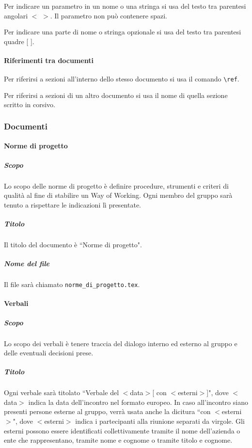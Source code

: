 \documentclass[a4paper, 12pt]{article}
\begin{document}
Per indicare un parametro in un nome o una stringa si usa del testo tra parentesi angolari $<$ $>$. Il parametro non può contenere spazi.

Per indicare una parte di nome o stringa opzionale si usa del testo tra parentesi quadre [ ].

\paragraph{Riferimenti tra documenti}
Per riferirsi a sezioni all'interno dello stesso documento si usa il comando \verb-\ref-.

Per riferirsi a sezioni di un altro documento si usa il nome di quella sezione scritto in corsivo.

\subsubsection{Documenti}\label{documentazione-documenti}

\paragraph{Norme di progetto}
\subparagraph{Scopo}
Lo scopo delle norme di progetto è definire procedure, strumenti e criteri di qualità al fine di stabilire un Way of Working. Ogni membro del gruppo sarà tenuto a rispettare le indicazioni lì presentate.
\subparagraph{Titolo}
Il titolo del documento è ``Norme di progetto".
\subparagraph{Nome del file}
Il file sarà chiamato \texttt{norme\_di\_progetto.tex}.

\paragraph{Verbali}
\subparagraph{Scopo}
Lo scopo dei verbali è tenere traccia del dialogo interno ed esterno al gruppo e delle eventuali decisioni prese.
\subparagraph{Titolo}
Ogni verbale sarà titolato ``Verbale del $<$data$>$[ con $<$esterni$>$]", dove $<$data$>$ indica la data dell'incontro nel formato europeo. In caso all'incontro siano presenti persone esterne al gruppo, verrà usata anche la dicitura ``con $<$esterni$>$", dove $<$esterni$>$ indica i partecipanti alla riunione separati da virgole. Gli esterni possono essere identificati collettivamente tramite il nome dell'azienda o ente che rappresentano, tramite nome e cognome o tramite titolo e cognome.
\end{document}
